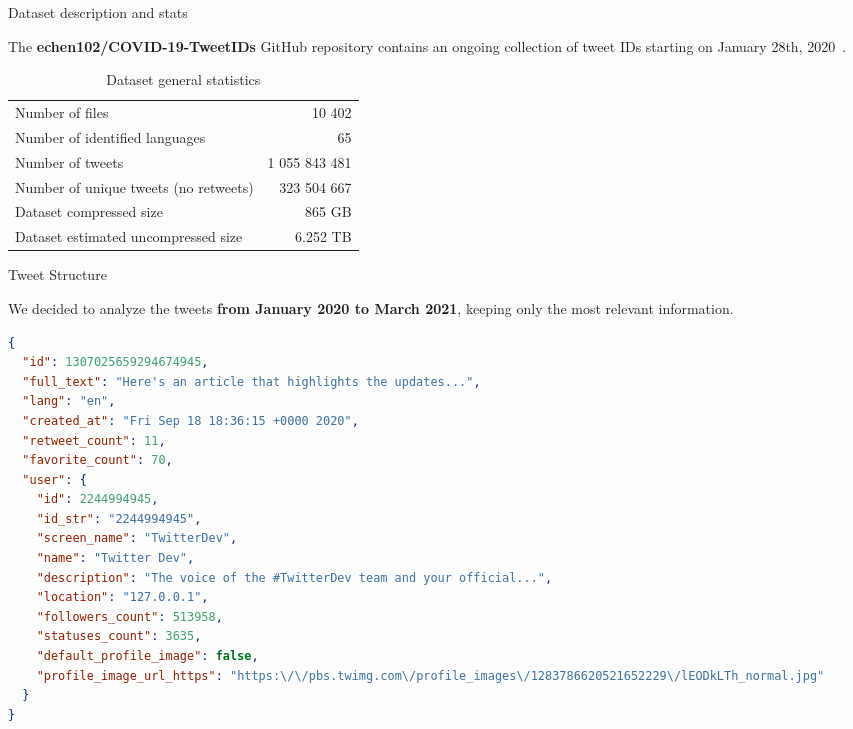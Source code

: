 \documentclass[8pt]{beamer}  %
\begin{document}
\begin{frame}{Dataset description and stats}

	The \textbf{echen102/COVID-19-TweetIDs} GitHub repository contains an ongoing collection of tweet IDs starting on January 28th, 2020~\autocite{chen2020tracking}.
	
	\begin{table}[H]
        \centering
        \begin{tabular}{lr}
            Number of files & 10 402
            \\
            Number of identified languages & 65
            \\
            Number of tweets & 1 055 843 481
            \\
            Number of unique tweets (no retweets) & 323 504 667
            \\
            Dataset compressed size & 865 GB
            \\
            Dataset estimated uncompressed size & 6.252 TB
        \end{tabular}
        \caption{Dataset general statistics}
        \label{tab:dataset-stats}
    \end{table}

\end{frame}

\begin{frame}[fragile]{Tweet Structure}

    We decided to analyze the tweets \textbf{from January 2020 to March 2021}, keeping only the most relevant information.
	
    \begin{lstlisting}[language=json, caption={Final json object for a tweet}, captionpos=b, label={lst:tweet_json}]
{
  "id": 1307025659294674945,
  "full_text": "Here's an article that highlights the updates...",
  "lang": "en",
  "created_at": "Fri Sep 18 18:36:15 +0000 2020",
  "retweet_count": 11,
  "favorite_count": 70,
  "user": {
    "id": 2244994945,
    "id_str": "2244994945",
    "screen_name": "TwitterDev",
    "name": "Twitter Dev",
    "description": "The voice of the #TwitterDev team and your official...",
    "location": "127.0.0.1",
    "followers_count": 513958,
    "statuses_count": 3635,
    "default_profile_image": false,
    "profile_image_url_https": "https:\/\/pbs.twimg.com\/profile_images\/1283786620521652229\/lEODkLTh_normal.jpg"
  }
}
    \end{lstlisting}
	
\end{frame}
\end{document}
